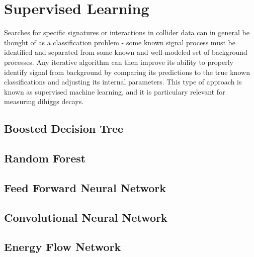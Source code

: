 \section{Supervised Learning}
\label{sec:supervised}
Searches for specific signatures or interactions in collider data can in general be thought of as a classification problem - some known signal process must be identified and separated from some known and well-modeled set of background processes. Any iterative algorithm can then improve its ability to properly identify signal from background by comparing its predictions to the true known classifications and adjusting its internal parameters. This type of approach is known as supervised machine learning, and it is particulary relevant for measuring dihiggs decays. 

\subsection{Boosted Decision Tree}


\subsection{Random Forest}


\subsection{Feed Forward Neural Network}


\subsection{Convolutional Neural Network}



%

\subsection{Energy Flow Network}

